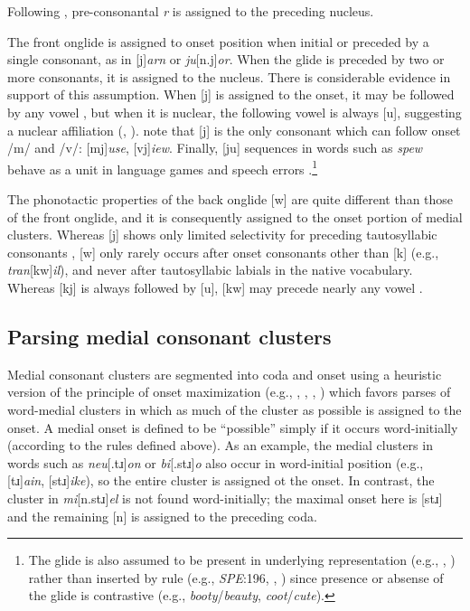 \documentclass[12pt]{article}
\begin{document}
\noindent
Following \citet{Pierrehumbert1994}, pre-consonantal \emph{r} is assigned to the preceding nucleus.

The front onglide is assigned to onset position when initial or preceded by a single consonant, as in [j]\emph{arn} or \emph{ju}[n.j]\emph{or}. When the glide is preceded by two or more consonants, it is assigned to the nucleus. There is considerable evidence in support of this assumption. When [j] is assigned to the onset, it may be followed by any vowel \citep[276]{Borowsky1986}, but when it is nuclear, the following vowel is always [u], suggesting a nuclear affiliation (\citealp[61f.]{Harris1994}, \citealp[232]{Hayes1980}). \citet[42]{Clements1983} note that [j] is the only consonant which can follow onset /m/ and /v/: [mj]\emph{use}, [vj]\emph{iew}. Finally, [ju] sequences in words such as \emph{spew} behave as a unit in language games \citep{Davis1995,Nevins2003} and speech errors \citep[130]{Shattuck-Hufnagel1986}.\footnote{The glide is also assumed to be present in underlying representation (e.g., \citealp{Anderson1988b}, \citealp[278]{Borowsky1986}) rather than inserted by rule (e.g., \emph{SPE}:196, \citealp[][89]{Halle1985a}, \citealp[][217]{McMahon1990}) since presence or absense of the glide is contrastive (e.g., \emph{booty}/\emph{beauty}, \emph{coot}/\emph{cute}).}

The phonotactic properties of the back onglide [w] are quite different than those of the front onglide, and it is consequently assigned to the onset portion of medial clusters. Whereas [j] shows only limited selectivity for preceding tautosyllabic consonants \citep{Kaye1996}, [w] only rarely occurs after onset consonants other than [k] (e.g., \emph{tran}[kw]\emph{il}), and never after tautosyllabic labials in the native vocabulary. Whereas [kj] is always followed by [u], [kw] may precede nearly any vowel \citep[161]{Davis1995}.

\subsection{Parsing medial consonant clusters}

Medial consonant clusters are segmented into coda and onset using a heuristic version of the principle of onset maximization (e.g., \citealp[42f.]{Kahn1976}, \citealp{Kurylowicz1948}, \citealp[75]{Pulgram1970}, \citealp[][358f.]{Selkirk1982b}) which favors parses of word-medial clusters in which as much of the cluster as possible is assigned to the onset. A medial onset is defined to be ``possible'' simply if it occurs word-initially (according to the rules defined above). As an example, the medial clusters in words such as \emph{neu}[.tɹ]\emph{on} or \emph{bi}[.stɹ]\emph{o} also occur in word-initial position (e.g., [tɹ]\emph{ain}, [stɹ]\emph{ike}), so the entire cluster is assigned ot the onset. In contrast, the cluster in \emph{mi}[n.stɹ]\emph{el} is not found word-initially; the maximal onset here is [stɹ] and the remaining [n] is assigned to the preceding coda.
\end{document}
